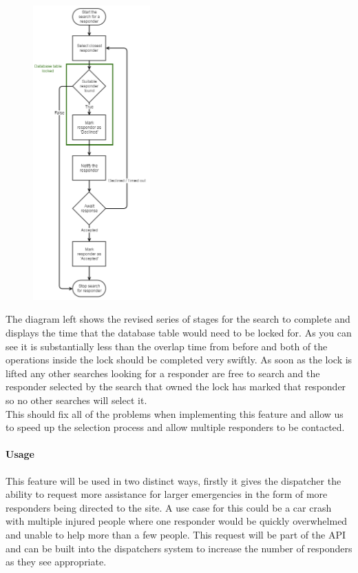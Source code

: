 \documentclass{article}
\begin{document}
\begin{figure}
  \begin{center}
    \includegraphics[width=0.4\textwidth]{"Iteration3/parallelization_of_search (4) (2)"}
  \end{center}
  \vspace{-250pt}
\end{figure}
The diagram left shows the revised series of stages for the search to complete and displays the time that the database table would need to be locked for. As you can see it is substantially less than the overlap time from before and both of the operations inside the lock should be completed very swiftly. As soon as the lock is lifted any other searches looking for a responder are free to search and the responder selected by the search that owned the lock has marked that responder so no other searches will select it.\\

This should fix all of the problems when implementing this feature and allow us to speed up the selection process and allow multiple responders to be contacted.\\

\pagebreak
\paragraph{Usage}
This feature will be used in two distinct ways, firstly it gives the dispatcher the ability to request more assistance for larger emergencies in the form of more responders being directed to the site. A use case for this could be a car crash with multiple injured people where one responder would be quickly overwhelmed and unable to help more than a few people. This request will be part of the API and can be built into the dispatchers system to increase the number of responders as they see appropriate.\\
\end{document}
